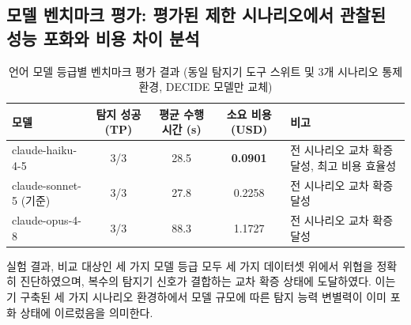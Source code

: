 

\subsection{모델 벤치마크 평가: 평가된 제한 시나리오에서 관찰된 성능 포화와 비용 차이 분석}
\label{subsec:model_bakeoff}

\begin{table}[t!]
\centering
\caption{언어 모델 등급별 벤치마크 평가 결과 (동일 탐지기 도구 스위트 및 3개 시나리오 통제 환경, DECIDE 모델만 교체)}
\label{tab:bakeoff_standard}
\renewcommand{\arraystretch}{1.2}
\small
\begin{tabularx}{\textwidth}{l c c c X}
\toprule
\textbf{모델} & \textbf{탐지 성공 (TP)} & \textbf{평균 수행 시간 (s)} & \textbf{소요 비용 (USD)} & \textbf{비고} \\
\midrule
claude-haiku-4-5       & 3/3 & 28.5 & \textbf{0.0901} & 전 시나리오 교차 확증 달성, 최고 비용 효율성 \\
claude-sonnet-5 (기준) & 3/3 & 27.8 & 0.2258          & 전 시나리오 교차 확증 달성 \\
claude-opus-4-8        & 3/3 & 88.3 & 1.1727          & 전 시나리오 교차 확증 달성 \\
\bottomrule
\end{tabularx}
\end{table}

\noindent 실험 결과, 비교 대상인 세 가지 모델 등급 모두 세 가지 데이터셋 위에서 위협을 정확히 진단하였으며, 복수의 탐지기 신호가 결합하는 교차 확증 상태에 도달하였다. 이는 기 구축된 세 가지 시나리오 환경하에서 모델 규모에 따른 탐지 능력 변별력이 이미 포화 상태에 이르렀음을 의미한다.

